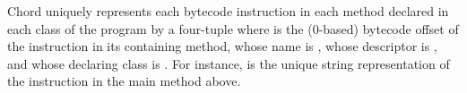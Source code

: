 Chord uniquely represents each bytecode instruction in each method
declared in each class of the program by a
four-tuple  where  is the
(0-based) bytecode offset of the instruction in its containing method,
whose name is , whose descriptor is , and
whose declaring class is .  For
instance, \code{8!main:[Ljava/lang/String;@test.HelloWorld} is the
unique string representation of the  instruction in the
main method above.
